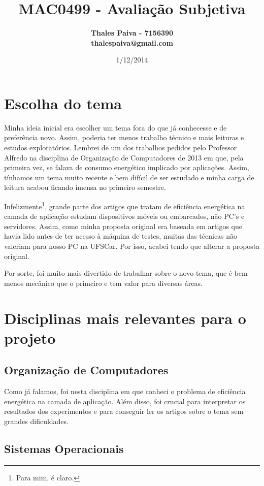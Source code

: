 \documentclass[a4paper,11pt]{article} %
\title{
	\textbf{
        MAC0499 - Avaliação Subjetiva
    }
}
\author	{
	\bf{Thales Paiva - 7156390}     \\
	thalespaiva@gmail.com       \\
}
\date{1/12/2014}
\begin{document}
\maketitle
\tableofcontents
\pagebreak


\section{Escolha do tema}
\mbox{}

Minha ideia inicial era escolher um tema fora do que já conhecesse e de preferência novo. Assim, poderia ter menos trabalho técnico e mais leituras e estudos exploratórios. Lembrei de um dos trabalhos pedidos pelo Professor Alfredo na disciplina de Organização de Computadores de 2013 em que, pela primeira vez, se falava de consumo energético implicado por aplicações. Assim, tínhamos um tema muito recente e bem difícil de ser estudado e minha carga de leitura acabou ficando imensa no primeiro semestre.

Infelizmente\footnote{Para mim, é claro.}, grande parte dos artigos que tratam de eficiência energética na camada de aplicação estudam dispositivos móveis ou embarcados, não PC's e servidores. Assim, como minha proposta original era baseada em artigos que havia lido antes de ter acesso à máquina de testes, muitas das técnicas não valeriam para nosso PC na UFSCar. Por isso, acabei tendo que alterar a proposta original.

Por sorte, foi muito mais divertido de trabalhar sobre o novo tema, que é bem menos mecânico que o primeiro e tem valor para diversas áreas.


\section{Disciplinas mais relevantes para o projeto}
\mbox{}

\subsection{Organização de Computadores}

Como já falamos, foi nesta disciplina em que conheci o problema de eficiência energética na camada de aplicação. Além disso, foi crucial para interpretar os resultados dos experimentos e para conseguir ler os artigos sobre o tema sem grandes dificuldades.

\subsection{Sistemas Operacionais}
\end{document}
